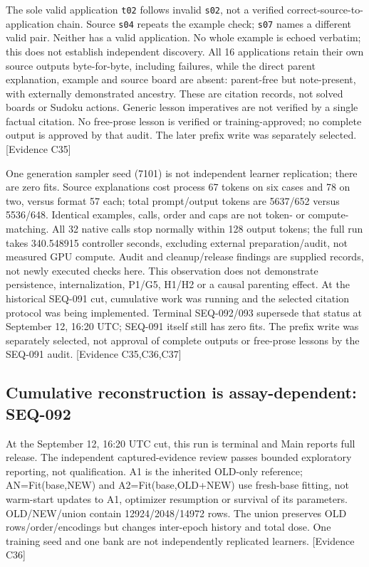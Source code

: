 \documentclass[11pt]{article}
\newcommand{\ev}[1]{\textsf{[Evidence #1]}}
\begin{document}
The sole valid application \texttt{t02} follows invalid \texttt{s02}, not a
verified correct-source-to-application chain. Source \texttt{s04} repeats the
example check; \texttt{s07} names a different valid pair. Neither has a valid
application. No whole example is echoed verbatim; this does not establish
independent discovery. All 16 applications retain their own source outputs
byte-for-byte, including failures, while the direct parent explanation,
example and source board are absent: parent-free but note-present, with
externally demonstrated ancestry. These are citation records, not solved
boards or Sudoku actions. Generic lesson imperatives are not verified by a
single factual citation. No free-prose lesson is verified or training-approved;
no complete output is approved by that audit. The later prefix write was
separately selected. \ev{C35}

One generation sampler seed (7101) is not independent learner replication;
there are zero fits. Source explanations cost process 67 tokens on six cases
and 78 on two, versus format 57 each; total prompt/output tokens are 5637/652
versus 5536/648. Identical examples, calls, order and caps are not token- or
compute-matching. All 32 native calls stop normally within 128 output tokens;
the full run takes 340.548915 controller seconds, excluding external
preparation/audit, not measured GPU compute. Audit and cleanup/release findings
are supplied records, not newly executed checks here. This observation does
not demonstrate persistence, internalization, P1/G5, H1/H2 or a causal parenting
effect. At the historical SEQ-091 cut, cumulative work was running and the
selected citation protocol was being implemented. Terminal SEQ-092/093
supersede that status at September 12, 16:20 UTC; SEQ-091 itself still has
zero fits. The prefix write was separately selected, not approval of complete
outputs or free-prose lessons by the SEQ-091 audit. \ev{C35,C36,C37}

\subsection{Cumulative reconstruction is assay-dependent: SEQ-092}
At the September 12, 16:20 UTC cut, this run is terminal and Main reports full
release. The independent captured-evidence review passes bounded exploratory
reporting, not qualification. A1 is the inherited OLD-only reference;
AN=Fit(base,NEW) and A2=Fit(base,OLD+NEW) use fresh-base fitting, not warm-start
updates to A1, optimizer resumption or survival of its parameters. OLD/NEW/union
contain 12924/2048/14972 rows. The union preserves OLD rows/order/encodings but
changes inter-epoch history and total dose. One training seed and one bank are
not independently replicated learners. \ev{C36}
\end{document}

